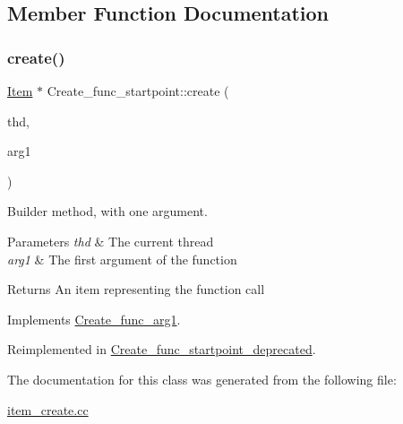 \subsection{Member Function Documentation}
\mbox{\label{classCreate__func__startpoint_ae7588448bfe733247410bb191dedc5d6}} 
\subsubsection{\texorpdfstring{create()}{create()}}
{\footnotesize\ttfamily \mbox{\hyperlink{classItem}{Item}} $\ast$ Create\+\_\+func\+\_\+startpoint\+::create (\begin{DoxyParamCaption}\item[{T\+HD $\ast$}]{thd,  }\item[{\mbox{\hyperlink{classItem}{Item}} $\ast$}]{arg1 }\end{DoxyParamCaption})\hspace{0.3cm}{\ttfamily [virtual]}}

Builder method, with one argument. 
\begin{DoxyParams}{Parameters}
{\em thd} & The current thread \\
\hline
{\em arg1} & The first argument of the function \\
\hline
\end{DoxyParams}
\begin{DoxyReturn}{Returns}
An item representing the function call 
\end{DoxyReturn}


Implements \mbox{\hyperlink{classCreate__func__arg1_a3e9a98f755cd82c3e762e334c955a8c9}{Create\+\_\+func\+\_\+arg1}}.



Reimplemented in \mbox{\hyperlink{classCreate__func__startpoint__deprecated_a037938ac02aa1a8553c82c913b85f3c3}{Create\+\_\+func\+\_\+startpoint\+\_\+deprecated}}.



The documentation for this class was generated from the following file\+:\begin{DoxyCompactItemize}
\item 
\mbox{\hyperlink{item__create_8cc}{item\+\_\+create.\+cc}}\end{DoxyCompactItemize}
